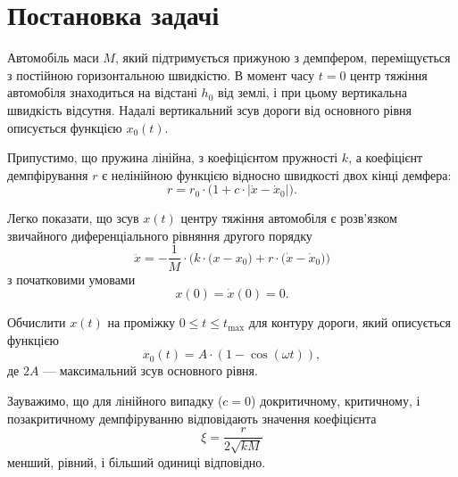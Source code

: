 




\tableofcontents

\section{Постановка задачі}

Автомобіль маси $M$, який підтримується прижуною з демпфером, переміщується з постійною горизонтальною швидкістю. В момент часу $t = 0$ центр тяжіння автомобіля знаходиться на відстані $h_0$ від землі, і при цьому вертикальна швидкість відсутня. Надалі вертикальний зсув дороги від основного рівня описується функцією $x_0(t)$. \medskip

Припустимо, що пружина лінійна, з коефіцієнтом пружності $k$, а коефіцієнт демпфірування $r$ є нелінійною функцією відносно швидкості двох кінці демфера:
\begin{equation}
	\label{eq:r-def}
	r = r_0 \cdot \Big( 1 + c \cdot \big| \dot x - \dot x_0 \big| \Big).
\end{equation}

Легко показати, що зсув $x(t)$ центру тяжіння автомобіля є розв'язком звичайного диференціального рівняння другого порядку
\begin{equation}
	\label{eq:x-diff-eq}
	\ddot x = - \frac{1}{M} \cdot \Big( k \cdot \big(x - x_0\big) + r \cdot \big(\dot x - \dot x_0\big) \Big)
\end{equation}
з початковими умовами 
	\begin{equation}
	x(0) = \dot x(0) = 0.
\end{equation}

Обчислити $x(t)$ на проміжку $0 \le t \le t_{\text{max}}$ для контуру дороги, який описується функцією
\begin{equation}
	x_0(t) = A \cdot (1 - \cos (\omega t)),
\end{equation}
де $2 A$ --- максимальний зсув основного рівня. \medskip

Зауважимо, що для лінійного випадку ($c = 0$) докритичному, критичному, і позакритичному демпфіруванню відповідають значення коефіцієнта
\begin{equation}
	\xi = \frac{r}{2 \sqrt{k M}}
\end{equation}
менший, рівний, і більший одиниці відповідно. \medskip

